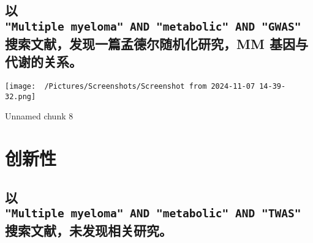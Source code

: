 \documentclass[
]{article}
\begin{document}
\begin{center}\vspace{1.5cm}\end{center}

\hypertarget{ux4ee5-multiple-myeloma-and-metabolic-and-gwas-ux641cux7d22ux6587ux732eux53d1ux73b0ux4e00ux7bc7ux5b5fux5fb7ux5c14ux968fux673aux5316ux7814ux7a76mm-ux57faux56e0ux4e0eux4ee3ux8c22ux7684ux5173ux7cfb}{%
\subsection{\texorpdfstring{以 \texttt{"Multiple\ myeloma"\ AND\ "metabolic"\ AND\ "GWAS"} 搜索文献，发现一篇孟德尔随机化研究，MM 基因与代谢的关系。}{以 "Multiple myeloma" AND "metabolic" AND "GWAS" 搜索文献，发现一篇孟德尔随机化研究，MM 基因与代谢的关系。}}\label{ux4ee5-multiple-myeloma-and-metabolic-and-gwas-ux641cux7d22ux6587ux732eux53d1ux73b0ux4e00ux7bc7ux5b5fux5fb7ux5c14ux968fux673aux5316ux7814ux7a76mm-ux57faux56e0ux4e0eux4ee3ux8c22ux7684ux5173ux7cfb}}

\begin{center}\vspace{1.5cm}\end{center}
\def\@captype{figure}
\begin{center}
\texttt{[image: ~/Pictures/Screenshots/Screenshot from 2024-11-07 14-39-32.png]}
\caption{Unnamed chunk 8}\label{fig:unnamed-chunk-8}
\end{center}

\begin{center}\vspace{1.5cm}\end{center}

\hypertarget{results}{%
\section{创新性}\label{results}}

\hypertarget{ux4ee5-multiple-myeloma-and-metabolic-and-twas-ux641cux7d22ux6587ux732eux672aux53d1ux73b0ux76f8ux5173ux7814ux7a76}{%
\subsection{\texorpdfstring{以 \texttt{"Multiple\ myeloma"\ AND\ "metabolic"\ AND\ "TWAS"} 搜索文献，未发现相关研究。}{以 "Multiple myeloma" AND "metabolic" AND "TWAS" 搜索文献，未发现相关研究。}}\label{ux4ee5-multiple-myeloma-and-metabolic-and-twas-ux641cux7d22ux6587ux732eux672aux53d1ux73b0ux76f8ux5173ux7814ux7a76}}
\end{document}
